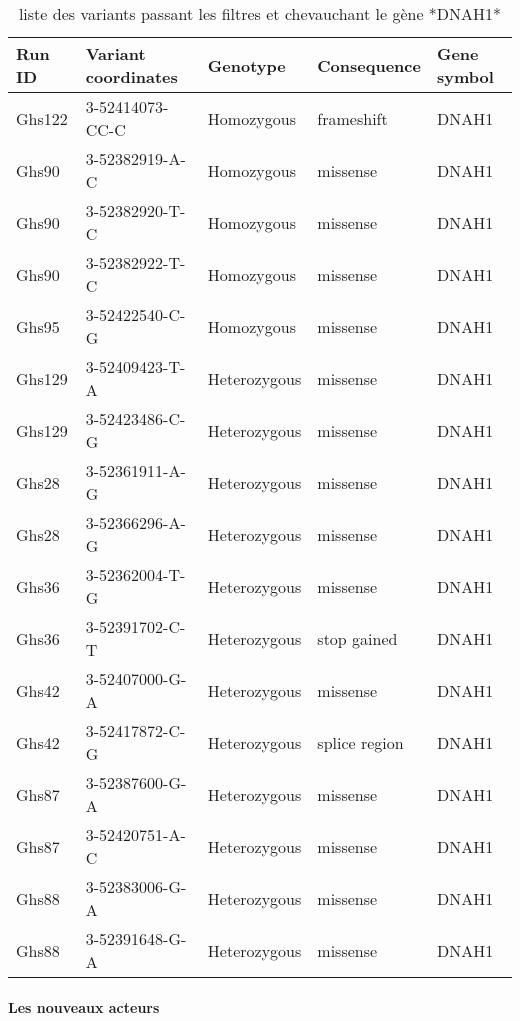 \documentclass[12pt,twoside]{reedthesis}
\theoremstyle{definition}
\theoremstyle{definition}
\theoremstyle{remark}
\begin{document}
  \begin{longtable}[t]{lllll}
  \caption{\label{tab:tabdnah1}liste des variants passant les filtres et chevauchant le gène *DNAH1*}\\
  \toprule
  Run ID & Variant coordinates & Genotype & Consequence & Gene symbol\\
  \midrule
  Ghs122 & 3-52414073-CC-C & Homozygous & frameshift & DNAH1\\
  Ghs90 & 3-52382919-A-C & Homozygous & missense & DNAH1\\
  Ghs90 & 3-52382920-T-C & Homozygous & missense & DNAH1\\
  Ghs90 & 3-52382922-T-C & Homozygous & missense & DNAH1\\
  Ghs95 & 3-52422540-C-G & Homozygous & missense & DNAH1\\
  \addlinespace
  Ghs129 & 3-52409423-T-A & Heterozygous & missense & DNAH1\\
  Ghs129 & 3-52423486-C-G & Heterozygous & missense & DNAH1\\
  Ghs28 & 3-52361911-A-G & Heterozygous & missense & DNAH1\\
  Ghs28 & 3-52366296-A-G & Heterozygous & missense & DNAH1\\
  Ghs36 & 3-52362004-T-G & Heterozygous & missense & DNAH1\\
  \addlinespace
  Ghs36 & 3-52391702-C-T & Heterozygous & stop gained & DNAH1\\
  Ghs42 & 3-52407000-G-A & Heterozygous & missense & DNAH1\\
  Ghs42 & 3-52417872-C-G & Heterozygous & splice region & DNAH1\\
  Ghs87 & 3-52387600-G-A & Heterozygous & missense & DNAH1\\
  Ghs87 & 3-52420751-A-C & Heterozygous & missense & DNAH1\\
  \addlinespace
  Ghs88 & 3-52383006-G-A & Heterozygous & missense & DNAH1\\
  Ghs88 & 3-52391648-G-A & Heterozygous & missense & DNAH1\\
  \bottomrule
  \end{longtable}
  
  \newpage
  
  \paragraph{Les nouveaux acteurs}\label{les-nouveaux-acteurs}
  
\end{document}
